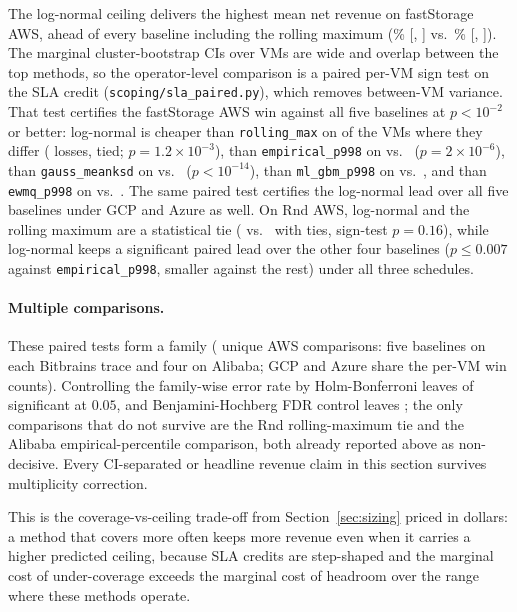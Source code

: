 \documentclass[11pt,a4paper]{article}
\begin{document}
The log-normal ceiling delivers the highest mean net revenue on
fastStorage AWS, ahead of every baseline including the rolling maximum
(\SlaFsLNAWSNet{}\% [\SlaFsLNAWSNetCiLo, \SlaFsLNAWSNetCiHi] vs.\
\SlaFsRMAWSNet{}\% [\SlaFsRMAWSNetCiLo, \SlaFsRMAWSNetCiHi]). The
marginal cluster-bootstrap CIs over VMs are wide and overlap between the
top methods, so the operator-level comparison is a paired per-VM sign
test on the SLA credit (\texttt{scoping/sla\_paired.py}), which removes
between-VM variance. That test certifies the fastStorage AWS win against
all five baselines at $p < 10^{-2}$ or better: log-normal is cheaper
than \texttt{rolling\_max} on \PairFsRMWin{} of the VMs where they differ
(\PairFsRMLoss{} losses, \PairFsRMTie{} tied; $p = 1.2\times10^{-3}$),
than \texttt{empirical\_p998} on \PairFsEPWin{} vs.\ \PairFsEPLoss{}
($p = 2\times10^{-6}$), than \texttt{gauss\_meanksd} on \PairFsGAWin{}
vs.\ \PairFsGALoss{} ($p < 10^{-14}$), than \texttt{ml\_gbm\_p998} on
\PairFsMLWin{} vs.\ \PairFsMLLoss{}, and than \texttt{ewmq\_p998} on
\PairFsEWWin{} vs.\ \PairFsEWLoss{}. The same paired test certifies
the log-normal lead over all five baselines under GCP and Azure as well.
On Rnd AWS, log-normal and the rolling maximum are a statistical tie
(\PairRnRMWin{} vs.\ \PairRnRMLoss{} with \PairRnRMTie{} ties, sign-test
$p = 0.16$), while log-normal keeps
a significant paired lead over the other four baselines ($p \leq 0.007$
against \texttt{empirical\_p998}, smaller against the rest) under all
three schedules.

\paragraph{Multiple comparisons.} These paired tests form a family
(\McFamily{} unique AWS comparisons: five baselines on each Bitbrains
trace and four on Alibaba; GCP and Azure share the per-VM win counts).
Controlling the family-wise error rate by Holm-Bonferroni leaves
\McHolmN{} of \McFamily{} significant at $0.05$, and Benjamini-Hochberg
FDR control leaves \McBHN{}; the only comparisons that do not survive are
the Rnd rolling-maximum tie and the Alibaba empirical-percentile
comparison, both already reported above as non-decisive. Every
CI-separated or headline revenue claim in this section survives
multiplicity correction.

This is the coverage-vs-ceiling trade-off from
Section~\ref{sec:sizing} priced in dollars: a method that covers more
often keeps more revenue even when it carries a higher predicted
ceiling, because SLA credits are step-shaped and the marginal cost of
under-coverage exceeds the marginal cost of headroom over the range
where these methods operate.
\end{document}
